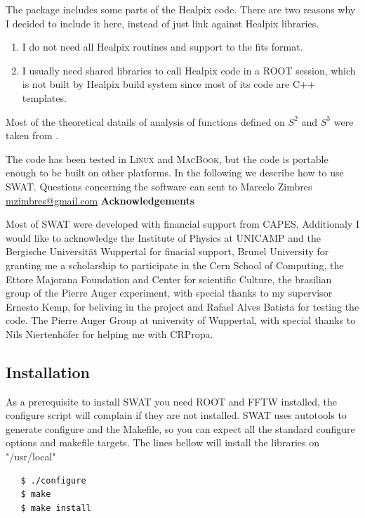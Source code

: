 \documentclass[12pt]{article}
\begin{document}
The package includes some parts of the Healpix code. There are two reasons why
I decided to include it here, instead of just link against Healpix libraries.
\begin{enumerate}
\item I do not need all Healpix routines and support to the fits format. 
\item I usually need shared libraries to call Healpix code in a ROOT session, which is not built by
Healpix build system since most of its code are C++ templates.
\end{enumerate}

Most of the theoretical datails of analysis of functions defined on $S^2$ and $S^3$ 
were taken from \cite{wiaux,rockmore,navaza}. 

The code has been tested in \textsc{Linux} and \textsc{MacBook}, but the code
is portable enough to be built on other platforms.  In the following we
describe how to use SWAT. Questions concerning the software can sent to Marcelo
Zimbres \href{mailto:mzimbres@gmail.com}{mzimbres@gmail.com}
\vspace{1cm}
\newline
{\bf \large Acknowledgements}
\vspace{1cm}

Most of SWAT were developed with financial support from CAPES.  Additionaly I
would like to acknowledge the Institute of Physics at UNICAMP and the Bergische
Universit\"at Wuppertal for finacial support, Brunel University for granting me a
scholarship to participate in the Cern School of Computing, the Ettore Majorana
Foundation and Center for scientific Culture, the brasilian group of the Pierre
Auger experiment, with special thanks to my supervisor Ernesto Kemp, for
beliving in the project and Rafael Alves Batista for testing the code. The
Pierre Auger Group at university of Wuppertal, with special thanks to Nils
Niertenh\"ofer for helping me with CRPropa.

\subsection{Installation} \label{ch::installation}
As a prerequisite to install SWAT you need ROOT and FFTW installed, the
configure script will complain if they are not installed. SWAT uses autotools
to generate configure and the Makefile, so you can expect all the standard
configure options and makefile targets. The lines bellow will install the
libraries on {\color{brown}"/usr/local"}
{ \color{brown}
   \begin{lstlisting}
   $ ./configure
   $ make
   $ make install
   \end{lstlisting}
}
\end{document}
